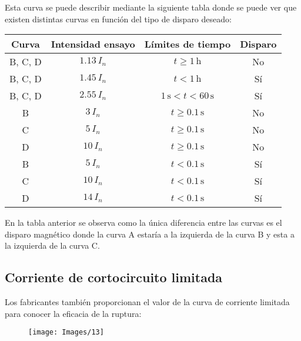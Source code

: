 Esta curva se puede describir mediante la siguiente tabla donde se puede ver que existen distintas curvas en función del tipo de disparo deseado:
\begin{table}[H]
	\centering
	\begin{tabular}{|c|c|c|c|}
		\hline
		\textbf{Curva} & \textbf{Intensidad ensayo} & \textbf{Límites de tiempo} & \textbf{Disparo} \\ \hline
		B, C, D & $1.13 \, I_n$ & $t \geq 1 \, \text{h}$ & No \\ \hline
		B, C, D & $1.45 \, I_n$ & $t < 1 \, \text{h}$ & Sí \\ \hline
		B, C, D & $2.55 \, I_n$ & $1 \, \text{s} < t < 60 \, \text{s}$ & Sí \\ \hline
		\color{red}
		B      &\color{red} $3 \, I_n$    &\color{red} $t \geq 0.1 \, \text{s}$ &\color{red} No \\ \hline
		\color{red}C      & \color{red}$5 \, I_n$    &\color{red} $t \geq 0.1 \, \text{s}$ &\color{red} No \\ \hline
		\color{red} D      &\color{red} $10 \, I_n$   &\color{red} $t \geq 0.1 \, \text{s}$ &\color{red} No \\ \hline
				\color{blue}
		B      &\color{blue} $5 \, I_n$    &\color{blue} $t < 0.1 \, \text{s}$ &\color{blue} Sí \\ \hline
		\color{blue} C      &\color{blue} $10 \, I_n$   &\color{blue} $t < 0.1 \, \text{s}$ &\color{blue} Sí \\ \hline
		\color{blue}D      &\color{blue} $14 \, I_n$   & \color{blue}$t < 0.1 \, \text{s}$ & \color{blue} Sí \\ \hline
	\end{tabular}
\end{table}
				\color{black}

En la tabla anterior se observa como la única diferencia entre las curvas es el disparo magnético donde la curva A estaría a la izquierda de la curva B y esta a la izquierda de la curva C.
\newpage
\subsection{Corriente de cortocircuito limitada}
Los fabricantes también proporcionan el valor de la curva de corriente limitada para conocer la eficacia de la ruptura:
\begin{figure}[H]
	\centering
	\texttt{[image: Images/13]}
	\label{fig:13}
\end{figure}
